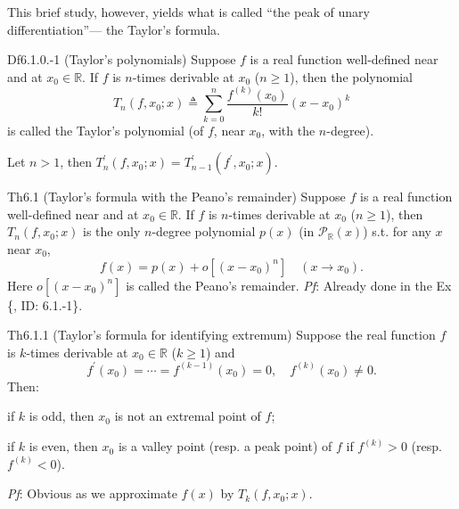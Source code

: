 \documentclass{article}
\begin{document}
\begin{Rmk}{}
    This brief study, however, yields what is called ``the peak of unary differentiation''— the Taylor's formula.
\end{Rmk}

\begin{Df}{Df6.1.0.-1 (Taylor's polynomials)}
    Suppose $f$ is a real function well-defined near and at $x_0\in\mathbb{R}$. If $f$ is $n$-times derivable at $x_0$ ($n\geq 1$), then the polynomial
    $$ T_n(f,x_0;x) \triangleq \sum_{k=0}^{n} \frac{f^{(k)}(x_0)}{k!} (x-x_0)^k $$
    is called the Taylor's polynomial (of $f$, near $x_0$, with the $n$-degree).
\end{Df}

\begin{Rmk}{}
    \textcolor{Th}{Let $n>1$, then $T_n^\prime (f,x_0;x) = T_{n-1}^\prime (f^\prime,x_0;x)$.}
\end{Rmk}

\begin{Th}{Th6.1 (Taylor's formula with the Peano's remainder)}
    Suppose $f$ is a real function well-defined near and at $x_0\in\mathbb{R}$. If $f$ is $n$-times derivable at $x_0$ ($n\geq 1$), then $T_n(f,x_0;x)$ is the only $n$-degree polynomial $p(x)$ (in $\mathcal{P}_\mathbb{R}(x)$) s.t. for any $x$ near $x_0$,
    $$ f(x) = p(x) + o[(x-x_0)^n] \quad (x\rightarrow x_0). $$
    Here $o[(x-x_0)^n]$ is called the Peano's remainder.
    \tcblower
    \textit{Pf}: Already done in the Ex \{, ID: 6.1.-1\}.
\end{Th}

\begin{Th}{Th6.1.1 (Taylor's formula for identifying extremum)}
    Suppose the real function $f$ is $k$-times derivable at $x_0\in\mathbb{R}$ ($k\geq 1$) and
    $$ f^\prime (x_0) = \cdots = f^{(k-1)}(x_0) = 0, \quad f^{(k)}(x_0)\neq 0. $$
    Then:
    \begin{compactenum}
        \item if $k$ is odd, then $x_0$ is not an extremal point of $f$;
        \item if $k$ is even, then $x_0$ is a valley point (resp. a peak point) of $f$ if $f^{(k)}>0$ (resp. $f^{(k)}<0$).
    \end{compactenum}
    \tcblower
    \textit{Pf}: Obvious as we approximate $f(x)$ by $T_k(f,x_0;x)$.
\end{Th}
\end{document}
